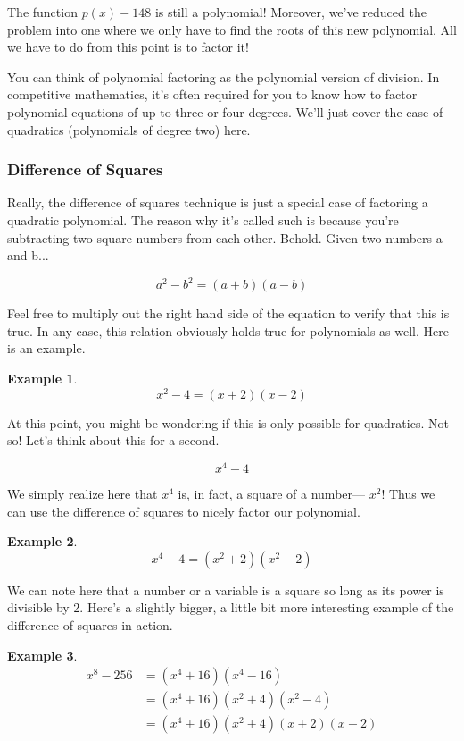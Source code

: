 \documentclass{scrbook}
\theoremstyle{definition}
\newtheorem{example}{Example}
\begin{document}
The function $p(x) - 148$ is still a polynomial! Moreover, we've reduced the problem into one where we only have to find the roots of this new polynomial. All we have to do from this point is to factor it!

You can think of polynomial factoring as the polynomial version of division. In competitive mathematics, it's often required for you to know how to factor polynomial equations of up to three or four degrees. We'll just cover the case of quadratics (polynomials of degree two) here.

\subsubsection{Difference of Squares}

Really, the difference of squares technique is just a special case of factoring a quadratic polynomial. The reason why it's called such is because you're subtracting two square numbers from each other. Behold. Given two numbers a and b...

\[
  a^2 - b^2 = (a + b)(a - b)
\]

Feel free to multiply out the right hand side of the equation to verify that this is true. In any case, this relation obviously holds true for polynomials as well. Here is an example.

\begin{example}
\[
  x^2 - 4 = (x + 2)(x - 2)
\]
\end{example}

At this point, you might be wondering if this is only possible for quadratics. Not so! Let's think about this for a second.

\[
  x^4 - 4
\]

We simply realize here that $x^4$ is, in fact, a square of a number--- $x^2$! Thus we can use the difference of squares to nicely factor our polynomial.

\begin{example}
\[
  x^4 - 4 = (x^2 + 2)(x^2 - 2)
\]
\end{example}

We can note here that a number or a variable is a square so long as its power is divisible by 2. Here's a slightly bigger, a little bit more interesting example of the difference of squares in action.

\begin{example}
  \begin{align*}
    x^8 - 256 &= (x^4 + 16)(x^4 - 16)\\
    &= (x^4 + 16)(x^2 + 4)(x^2 - 4)\\
    &= (x^4 + 16)(x^2 + 4)(x + 2)(x - 2)
  \end{align*}
\end{example}
\end{document}
